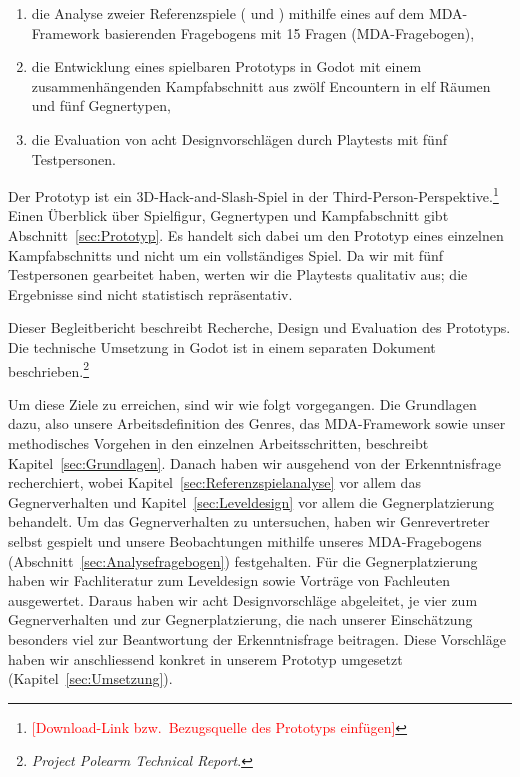 \documentclass[../Main.tex]{subfiles}
\begin{document}
\begin{enumerate}
    \item die Analyse zweier Referenzspiele ( und ) mithilfe eines auf dem MDA-Framework basierenden Fragebogens mit 15 Fragen (MDA-Fragebogen),
    \item die Entwicklung eines spielbaren Prototyps in Godot mit einem zusammenhängenden Kampfabschnitt aus zwölf Encountern in elf Räumen und fünf Gegnertypen,
    \item die Evaluation von acht Designvorschlägen durch Playtests mit fünf Testpersonen.
\end{enumerate}

Der Prototyp ist ein 3D-Hack-and-Slash-Spiel in der Third-Person-Perspektive.\footnote{\textcolor{red}{[Download-Link bzw.\ Bezugsquelle des Prototyps einfügen]}} Einen Überblick über Spielfigur, Gegnertypen und Kampfabschnitt gibt Abschnitt~\ref{sec:Prototyp}. Es handelt sich dabei um den Prototyp eines einzelnen Kampfabschnitts und nicht um ein vollständiges Spiel. Da wir mit fünf Testpersonen gearbeitet haben, werten wir die Playtests qualitativ aus; die Ergebnisse sind nicht statistisch repräsentativ.

Dieser Begleitbericht beschreibt Recherche, Design und Evaluation des Prototyps. Die technische Umsetzung in Godot ist in einem separaten Dokument beschrieben.\footnote{\textit{Project Polearm Technical Report}.}

Um diese Ziele zu erreichen, sind wir wie folgt vorgegangen. Die Grundlagen dazu, also unsere Arbeitsdefinition des Genres, das MDA-Framework sowie unser methodisches Vorgehen in den einzelnen Arbeitsschritten, beschreibt Kapitel~\ref{sec:Grundlagen}. Danach haben wir ausgehend von der Erkenntnisfrage recherchiert, wobei Kapitel~\ref{sec:Referenzspielanalyse} vor allem das Gegnerverhalten und Kapitel~\ref{sec:Leveldesign} vor allem die Gegnerplatzierung behandelt. Um das Gegnerverhalten zu untersuchen, haben wir Genrevertreter selbst gespielt und unsere Beobachtungen mithilfe unseres MDA-Fragebogens (Abschnitt~\ref{sec:Analysefragebogen}) festgehalten. Für die Gegnerplatzierung haben wir Fachliteratur zum Leveldesign\autocite{totten2014architectural,rogers2014levelup} sowie Vorträge von Fachleuten\autocite{gdc_tenprinciples2010,gdc_leveldesignaday2020,gdc_movingmountains2020,gdc_horizonquests2018} ausgewertet. Daraus haben wir acht Designvorschläge abgeleitet, je vier zum Gegnerverhalten und zur Gegnerplatzierung, die nach unserer Einschätzung besonders viel zur Beantwortung der Erkenntnisfrage beitragen. Diese Vorschläge haben wir anschliessend konkret in unserem Prototyp umgesetzt (Kapitel~\ref{sec:Umsetzung}).
\end{document}
